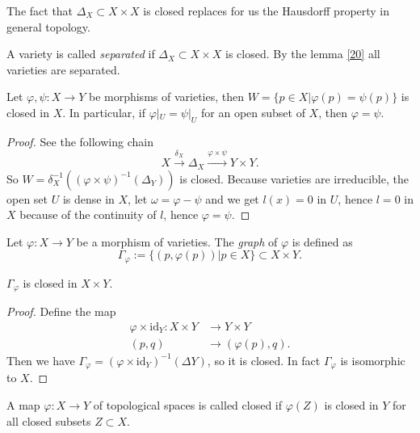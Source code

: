 \begin{remark}
	The fact that $ \Delta_X\subset X\times X $ is closed replaces for us the Hausdorff property in general topology.
\end{remark}
\begin{definition}
	A variety is called \textit{separated} if $ \Delta_X\subset X\times X $ is closed. By the lemma \ref{20} all varieties are separated.
\end{definition}
\begin{corollary}
	Let $ \varphi,\psi:X\to Y $ be morphisms of varieties, then $ W=\{ p\in X|\varphi(p)=\psi(p) \} $ is closed in $ X $. In particular, if $ \varphi|_U=\psi|_U $ for an open subset of $ X $, then $ \varphi=\psi $.
\end{corollary}
\begin{proof}
	See the following chain
	$$
		X\xrightarrow{\delta_X} \Delta_X\xrightarrow{\varphi\times\psi} Y\times Y.
	$$
	So $ W=\delta_X^{-1}( (\varphi\times\psi)^{-1}(\Delta_Y) ) $ is closed. Because varieties are irreducible, the open set $ U $ is dense in $ X $, let $ \omega = \varphi-\psi $ and we get $ l(x)=0 $ in $ U $, hence $ l=0 $ in $ X $ because of the continuity of $ l $, hence $ \varphi=\psi $.
\end{proof}
\begin{definition}
	Let $ \varphi :X\to Y $ be a morphism of varieties. The \textit{graph} of $ \varphi $ is defined as
	\begin{equation}
		\Gamma_{\varphi}:=\{ \left(p,\varphi\left(p\right)\right)| p\in X \}\subset X\times Y.
	\end{equation}
\end{definition}
\begin{corollary}
	$ \Gamma_\varphi $ is closed in $ X\times Y $.
\end{corollary}
\begin{proof}
	Define the map
	$$\begin{array}{cc}
			\varphi\times\text{id}_Y : X\times Y & \to Y\times Y       \\
			(p,q)                                & \to (\varphi(p),q).
		\end{array}$$
	Then we have $ \Gamma_\varphi = (\varphi\times\text{id}_Y)^{-1}(\Delta Y) $, so it is closed. In fact $ \Gamma_\varphi $ is isomorphic to $ X $.
\end{proof}
\begin{definition}
	A map $ \varphi:X\to Y $ of topological spaces is called closed if $ \varphi(Z) $ is closed in $ Y $ for all closed subsets $ Z\subset X $.
\end{definition}

